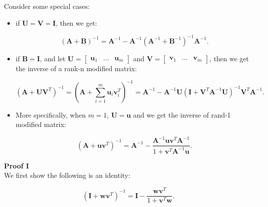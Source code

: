 \documentclass[10pt,b5paper,titlepage]{book}
\begin{document}
Consider some special cases:

\begin{itemize}
    \item if $\mathbf{U} = \mathbf{V} = \mathbf{I}$, then we get:

        \begin{equation}
            (\mathbf{A}+\mathbf{B})^{-1}
            = \mathbf{A}^{-1}
            - \mathbf{A}^{-1}(\mathbf{A}^{-1} + \mathbf{B}^{-1})^{-1} \mathbf{A}^{-1}
        .\end{equation}

    \item if $\mathbf{B} = \mathbf{I}$, and let
        $\mathbf{U} = \begin{bmatrix} \mathbf{u}_1 & \ldots & \mathbf{u}_m \end{bmatrix}$
        and $\mathbf{V} = \begin{bmatrix} \mathbf{v}_1 & \ldots & \mathbf{v}_m \end{bmatrix}$,
        then we get the inverse of a rank-n modified matrix:

        \begin{equation}
            (\mathbf{A} + \mathbf{U}\mathbf{V}^{T})^{-1}
            = \left( \mathbf{A}
            + \sum_{i=1}^{m} \mathbf{u}_{i}\mathbf{v}_{i}^{T} \right)^{-1}
            = \mathbf{A}^{-1} - \mathbf{A}^{-1}\mathbf{U}
            (\mathbf{I} + \mathbf{V}^{T}\mathbf{A}^{-1}\mathbf{U})^{-1}
            \mathbf{V}^{T}\mathbf{A}^{-1}
        .\end{equation}

    \item More specifically, when $m = 1$, $\mathbf{U} = \mathbf{u}$ and we
        get the inverse of rand-1 modified matrix:

        \begin{equation}
            (\mathbf{A} + \mathbf{u}\mathbf{v}^{T})^{-1}
            = \mathbf{A}^{-1}
            - \frac{\mathbf{A}^{-1}\mathbf{u}\mathbf{v}^{T}\mathbf{A}^{-1}}
            {1 + \mathbf{v}^{T}\mathbf{A}^{-1}\mathbf{u}}
        .\end{equation}
\end{itemize}

\textbf{Proof I}\\

We first show the following is an identity:

\begin{equation}
    (\mathbf{I} + \mathbf{w}\mathbf{v}^{T})^{-1}
    = \mathbf{I} - \frac{\mathbf{w}\mathbf{v}^{T}}{1 + \mathbf{v}^{T}\mathbf{w}}
.\end{equation}
\end{document}
